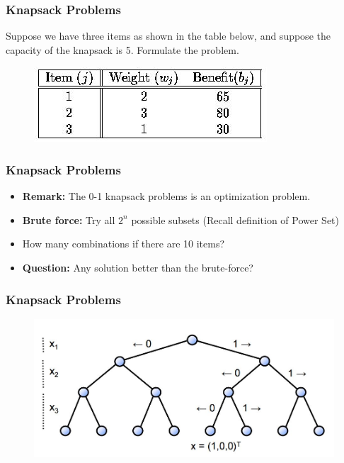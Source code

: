 \documentclass{beamer}
\begin{document}
\begin{frame}
	\frametitle{Knapsack Problems}
	\Large
Suppose we have three items as shown in the table below, and suppose the capacity of the knapsack is 5. Formulate the problem.
	\begin{figure}
\centering
\includegraphics[width=0.7\linewidth]{knapsackexample}
\end{figure}

\end{frame}
\begin{frame}
	\frametitle{Knapsack Problems}
	\Large
	\begin{itemize}
		\item \textbf{Remark:} The 0-1 knapsack problems is an optimization problem.
		\item \textbf{Brute force:} Try all $2^n$ possible subsets (Recall definition of Power Set)
		\item How many combinations if there are 10 items?
		\item	\textbf{Question:} Any solution better than the brute-force?
	\end{itemize}
\end{frame}
\begin{frame}
	\frametitle{Knapsack Problems}
	\Large
	\begin{figure}
\centering
\includegraphics[width=1.1\linewidth]{01knapsack-tree}
\end{figure}

\end{frame}
\end{document}
